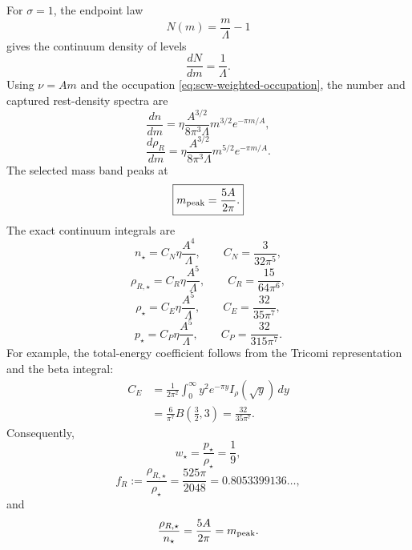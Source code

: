 For $\sigma=1$, the endpoint law
\begin{equation}
 N(m)=\frac{m}{\Lambda}-1
 \label{eq:scw-state-count}
\end{equation}
gives the continuum density of levels
\begin{equation}
 \frac{dN}{dm}=\frac1\Lambda.
 \label{eq:scw-density-of-levels}
\end{equation}
Using $\nu=Am$ and the occupation \eqref{eq:scw-weighted-occupation}, the number and captured rest-density spectra are
\begin{equation}
 \frac{dn}{dm}
 =\eta\frac{A^{3/2}}{8\pi^3\Lambda}
 m^{3/2}e^{-\pi m/A},
 \label{eq:scw-number-spectrum}
\end{equation}
\begin{equation}
 \boxed{
 \frac{d\rho_R}{dm}
 =\eta\frac{A^{3/2}}{8\pi^3\Lambda}
 m^{5/2}e^{-\pi m/A}.}
 \label{eq:scw-rest-spectrum}
\end{equation}
The selected mass band peaks at
\begin{equation}
 \boxed{
 m_{\rm peak}=\frac{5A}{2\pi}.}
 \label{eq:scw-mass-peak}
\end{equation}
The exact continuum integrals are
\begin{equation}
 n_\star=C_N\eta\frac{A^4}{\Lambda},
 \qquad
 C_N=\frac{3}{32\pi^5},
 \label{eq:scw-number-constant}
\end{equation}
\begin{equation}
 \rho_{R,\star}=C_R\eta\frac{A^5}{\Lambda},
 \qquad
 C_R=\frac{15}{64\pi^6},
 \label{eq:scw-rest-constant}
\end{equation}
\begin{equation}
 \rho_\star=C_E\eta\frac{A^5}{\Lambda},
 \qquad
 C_E=\frac{32}{35\pi^7},
 \label{eq:scw-energy-constant}
\end{equation}
\begin{equation}
 p_\star=C_P\eta\frac{A^5}{\Lambda},
 \qquad
 C_P=\frac{32}{315\pi^7}.
 \label{eq:scw-pressure-constant}
\end{equation}
For example, the total-energy coefficient follows from the Tricomi representation and the beta integral:
\begin{equation}
\begin{aligned}
 C_E
 &=\frac{1}{2\pi^2}
 \int_0^\infty y^2e^{-\pi y}I_\rho(\sqrt y)\,dy\\
 &=\frac{6}{\pi^7}B\left(\frac32,3\right)
 =\frac{32}{35\pi^7}.
\end{aligned}
 \label{eq:scw-energy-beta-proof}
\end{equation}
Consequently,
\begin{equation}
 \boxed{
 w_\star=\frac{p_\star}{\rho_\star}=\frac19,}
 \label{eq:scw-production-w}
\end{equation}
\begin{equation}
 \boxed{
 f_R:=\frac{\rho_{R,\star}}{\rho_\star}
 =\frac{525\pi}{2048}
 =0.8053399136\ldots,}
 \label{eq:scw-rest-fraction}
\end{equation}
and
\begin{equation}
 \frac{\rho_{R,\star}}{n_\star}
 =\frac{5A}{2\pi}
 =m_{\rm peak}.
 \label{eq:scw-mean-mass}
\end{equation}

